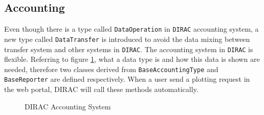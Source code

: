 \subsection{Accounting}

Even though there is a type called {\tt DataOperation} in {\tt DIRAC}
accounting system, a new type called {\tt DataTransfer}
is introduced to avoid the data mixing between transfer system
and other systems in {\tt DIRAC}.
The accounting system 
in {\tt DIRAC} is flexible. Referring to figure \ref{fig:acct},
what a data type is and how this data is shown
are needed,
therefore two classes derived from {\tt BaseAccountingType}
and {\tt BaseReporter} are defined respectively.
When a user send a plotting request in the web portal, 
DIRAC will call these methods automatically.
\begin{figure}[htbp]
    
    \caption{\label{fig:acct}DIRAC Accounting System}
\end{figure}
